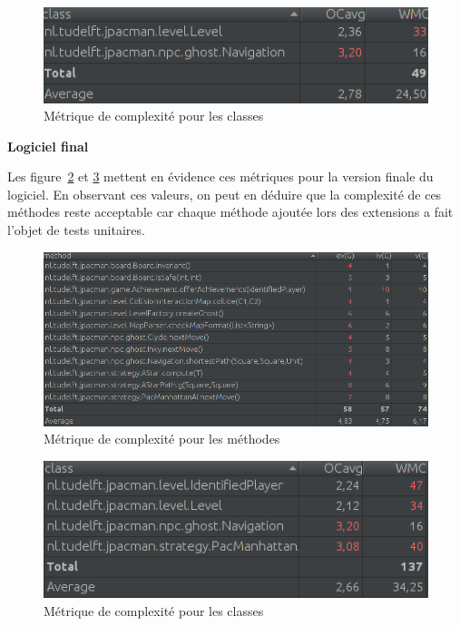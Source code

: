 \documentclass[12pt, openany]{report}
\begin{document}
\begin{figure}[!h]
	\centering
	\includegraphics[scale=0.6]{Images/ComplexityMetrics2.png} 
	\caption{Métrique de complexité pour les classes}
	\label{ComplexityMetrics2}
\end{figure}
\newpage
\textbf{Logiciel final}

Les figure~\ref{ComplexityMetrics3} et \ref{ComplexityMetrics4}  mettent en évidence ces métriques pour la version finale du logiciel. En observant ces valeurs, on peut en déduire que la complexité de ces méthodes reste acceptable car chaque méthode ajoutée lors des extensions a fait l'objet de tests unitaires.

\begin{figure}[!h]
	\centering
	\includegraphics[scale=0.6]{Images/ComplexityMetrics3.png} 
	\caption{Métrique de complexité pour les méthodes}
	\label{ComplexityMetrics3}
\end{figure}


\begin{figure}[!h]
	\centering
	\includegraphics[scale=0.6]{Images/ComplexityMetrics4.png} 
	\caption{Métrique de complexité pour les classes}
	\label{ComplexityMetrics4}
\end{figure}
\end{document}
